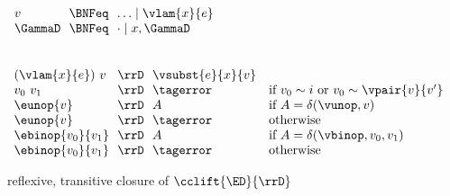 \begin{flushleft}

\\
$\begin{array}{l@{~~}c@{~~}l}
  v & \BNFeq & \ldots \mid \vlam{x}{e}
\\
  \GammaD & \BNFeq & \cdot \mid x,\GammaD
\end{array}$

\smallskip
{}
\begin{mathpar}






\end{mathpar}

\smallskip
{}\\
$\begin{array}{l@{~~}c@{~~}l l}
  (\vlam{x}{e})~v & \rrD & \vsubst{e}{x}{v} &
\\
  v_0~v_1 & \rrD & \tagerror & \mbox{if $v_0 \sim i$ or $v_0 \sim \vpair{v}{v'}$}
\\
  \eunop{v} & \rrD & A & \mbox{if $A = \delta(\vunop, v)$}
\\
  \eunop{v} & \rrD & \tagerror & \mbox{otherwise}
\\
  \ebinop{v_0}{v_1} & \rrD & A & \mbox{if $A = \delta(\vbinop, v_0, v_1)$}
\\
  \ebinop{v_0}{v_1} & \rrD & \tagerror & \mbox{otherwise}
\end{array}$

\smallskip
{} reflexive, transitive closure of $\cclift{\ED}{\rrD}$

\end{flushleft}
